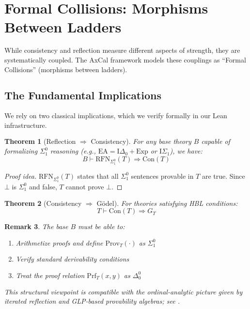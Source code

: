 \documentclass[11pt]{article}
\newtheorem{theorem}{Theorem}[section]
\newtheorem{remark}[theorem]{Remark}
\newcommand{\EA}{\mathrm{EA}}
\newcommand{\ISigma}{\mathrm{I}\Sigma_1}
\newcommand{\Con}{\mathrm{Con}}
\newcommand{\RFNSigOne}{\mathrm{RFN}_{\Sigma^0_1}}
\newcommand{\Prov}{\mathrm{Prov}}
\begin{document}
\section{Formal Collisions: Morphisms Between Ladders}

While consistency and reflection measure different aspects of strength, they are systematically coupled. The AxCal framework models these couplings as ``Formal Collisions'' (morphisms between ladders).

\subsection{The Fundamental Implications}
We rely on two classical implications, which we verify formally in our Lean infrastructure.

\begin{theorem}[Reflection $\Rightarrow$ Consistency]\label{thm:RFN-implies-Con}
For any base theory $B$ capable of formalizing $\Sigma^0_1$ reasoning (e.g., $\EA = \mathrm{I}\Delta_0 + \mathrm{Exp}$ or $\ISigma$), we have:
$$B \vdash \RFNSigOne(T) \Rightarrow \Con(T)$$
\end{theorem}
\begin{proof}[Proof idea]
$\RFNSigOne(T)$ states that all $\Sigma^0_1$ sentences provable in $T$ are true. Since $\bot$ is $\Sigma^0_1$ and false, $T$ cannot prove $\bot$.
\end{proof}

\begin{theorem}[Consistency $\Rightarrow$ Gödel]\label{thm:Con-implies-G}
For theories satisfying HBL conditions:
$$T \vdash \Con(T) \Rightarrow G_T$$
\end{theorem}

\begin{remark}
The base $B$ must be able to:
\begin{enumerate}
\item Arithmetize proofs and define $\Prov_T(\cdot)$ as $\Sigma^0_1$
\item Verify standard derivability conditions
\item Treat the proof relation $\mathrm{Prf}_T(x,y)$ as $\Delta^0_0$
\end{enumerate}
This structural viewpoint is compatible with the ordinal-analytic picture given by iterated reflection and GLP-based provability algebras; see \cite{Beklemishev2003,Beklemishev2004,ArtemovBeklemishev2004}.
\end{remark}
\end{document}
